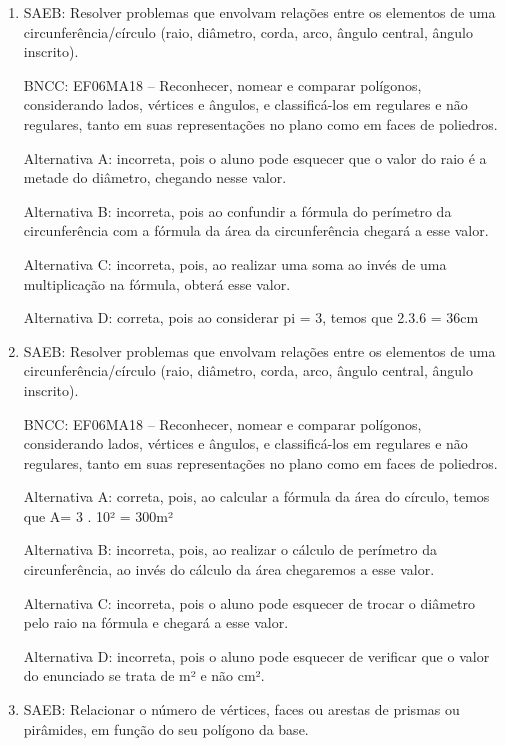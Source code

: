 
	\begin{enumerate}

		\item SAEB: Resolver problemas que envolvam relações entre os elementos de uma
circunferência/círculo (raio, diâmetro, corda, arco, ângulo central,
ângulo inscrito).

BNCC: EF06MA18 -- Reconhecer, nomear e comparar polígonos, considerando
lados, vértices e ângulos, e classificá-los em regulares e não
regulares, tanto em suas representações no plano como em faces de
poliedros.

Alternativa A: incorreta, pois o aluno pode esquecer que o valor do raio
é a metade do diâmetro, chegando nesse valor.

Alternativa B: incorreta, pois ao confundir a fórmula do perímetro da
circunferência com a fórmula da área da circunferência chegará a esse
valor.

Alternativa C: incorreta, pois, ao realizar uma soma ao invés de uma
multiplicação na fórmula, obterá esse valor.

Alternativa D: correta, pois ao considerar pi = 3, temos que 2.3.6 =
36cm

		\item SAEB: Resolver problemas que envolvam relações entre os elementos de uma
circunferência/círculo (raio, diâmetro, corda, arco, ângulo central,
ângulo inscrito).

BNCC: EF06MA18 -- Reconhecer, nomear e comparar polígonos, considerando
lados, vértices e ângulos, e classificá-los em regulares e não
regulares, tanto em suas representações no plano como em faces de
poliedros.

Alternativa A: correta, pois, ao calcular a fórmula da área do círculo,
temos que A= 3 . 10² = 300m²

Alternativa B: incorreta, pois, ao realizar o cálculo de perímetro da
circunferência, ao invés do cálculo da área chegaremos a esse valor.

Alternativa C: incorreta, pois o aluno pode esquecer de trocar o
diâmetro pelo raio na fórmula e chegará a esse valor.

Alternativa D: incorreta, pois o aluno pode esquecer de verificar que o
valor do enunciado se trata de m² e não cm².

		\item SAEB: Relacionar o número de vértices, faces ou arestas de prismas ou
pirâmides, em função do seu polígono da base.


\end{enumerate}
